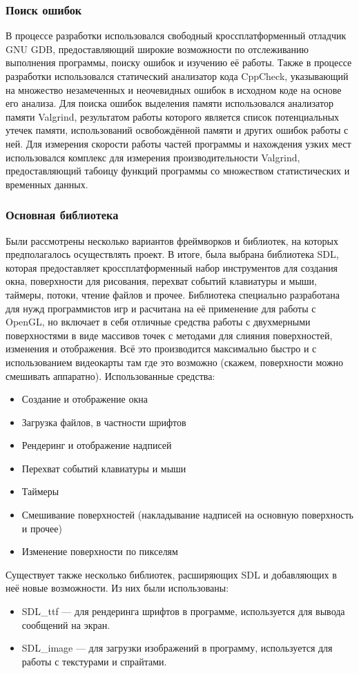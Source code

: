 \documentclass[a4paper,12pt]{report}
\numberwithin{equation}{section}
\begin{document}
\subsubsection{Поиск ошибок}
В процессе разработки использовался свободный кроссплатформенный отладчик GNU GDB, предоставляющий широкие возможности по отслеживанию выполнения программы, поиску ошибок и изучению её работы. Также в процессе разработки использовался статический анализатор кода CppCheck, указывающий на множество незамеченных и неочевидных ошибок в исходном коде на основе его анализа. Для поиска ошибок выделения памяти использовался анализатор памяти Valgrind, результатом работы которого является список потенциальных утечек памяти, использований освобождённой памяти и других ошибок работы с ней. Для измерения скорости работы частей программы и нахождения узких мест использовался комплекс для измерения производительности Valgrind, предоставляющий табоицу функций программы со множеством статистических и временных данных.

\subsubsection{Основная библиотека}
Были рассмотрены несколько вариантов фреймворков и библиотек, на которых предполагалось осуществлять проект. В итоге, была выбрана библиотека SDL, которая предоставляет кроссплатформенный набор инструментов для создания окна, поверхности для рисования, перехват событий клавиатуры и мыши, таймеры, потоки, чтение файлов и прочее. Библиотека специально разработана для нужд программистов игр и расчитана на её применение для работы с OpenGL, но включает в себя отличные средства работы с двухмерными поверхностями в виде массивов точек с методами для слияния поверхностей, изменения и отображения. Всё это производится максимально быстро и с использованием видеокарты там где это возможно (скажем, поверхности можно смешивать аппаратно). Использованные средства:
\begin{itemize}
\item Создание и отображение окна
\item Загрузка файлов, в частности шрифтов
\item Рендеринг и отображение надписей
\item Перехват событий клавиатуры и мыши
\item Таймеры
\item Смешивание поверхностей (накладывание надписей на основную поверхность и прочее)
\item Изменение поверхности по пикселям
\end{itemize}
Существует также несколько библиотек, расширяющих SDL и добавляющих в неё новые возможности. Из них были использованы:
\begin{itemize}
\item SDL\_ttf --- для рендеринга шрифтов в программе, используется для вывода сообщений на экран.
\item SDL\_image --- для загрузки изображений в программу, используется для работы с текстурами и спрайтами.
\end{itemize}
\end{document}
